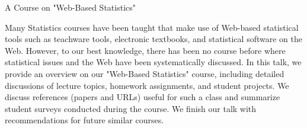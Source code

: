 A Course on "Web-Based Statistics"

Many Statistics courses have been taught that make use of Web-based
statistical tools such as teachware tools, electronic textbooks,
and statistical software on the Web. However, to our best knowledge,
there has been no course before where statistical issues and the Web
have been systematically discussed. In this talk, we provide an overview
on our "Web-Based Statistics" course, including detailed discussions of
lecture topics, homework assignments, and student projects. We discuss
references (papers and URLs) useful for such a class and summarize student
surveys conducted during the course. We finish our talk with recommendations
for future similar courses.

